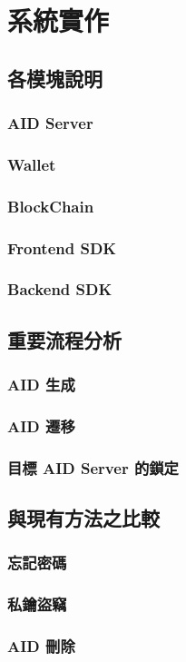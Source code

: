 
\chapter{系統實作}

\section{各模塊說明}
\subsection{AID Server}
\subsection{Wallet}
\subsection{BlockChain}
\subsection{Frontend SDK}
\subsection{Backend SDK}

\section{重要流程分析}
\subsection{AID 生成}
\subsection{AID 遷移}
\subsection{目標 AID Server 的鎖定}

\section{與現有方法之比較}
\subsection{忘記密碼}
\subsection{私鑰盜竊}
\subsection{AID 刪除}
